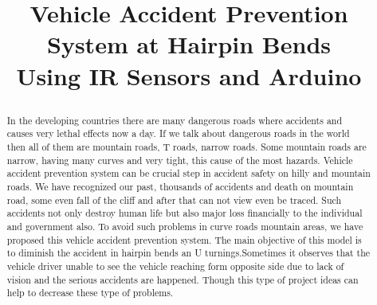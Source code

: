 \documentclass[conference]{IEEEtran}
\begin{document}
    \title{Vehicle Accident Prevention System at Hairpin Bends\\{
    \large Using IR Sensors and Arduino
    }

        }

    \author{
    \and
    \and
    \and
    \and

    }

    \maketitle

    \begin{abstract}
        In the developing countries there are many dangerous roads where accidents and causes very lethal effects now a day.
        If we talk about dangerous roads in the world then all of them are mountain roads, T roads, narrow roads. Some mountain
        roads are narrow, having many curves and very tight, this cause of the most hazards.
        Vehicle accident prevention system can be crucial step in accident safety on hilly and mountain roads. We have recognized our
        past, thousands of accidents and death on mountain road, some even fall of the cliff and after that can not view even be traced.
        Such accidents not only destroy human life but also major loss financially to the individual and government also. To avoid such
        problems in curve roads mountain areas, we have proposed this vehicle accident prevention system. The main objective of this
        model is to diminish the accident in hairpin bends an U turnings.Sometimes it observes that the vehicle driver unable to see the
        vehicle reaching form opposite side due to lack of vision and the serious accidents are happened. Though this type of project
        ideas can help to decrease these type of problems.
    \end{abstract}
\end{document}

